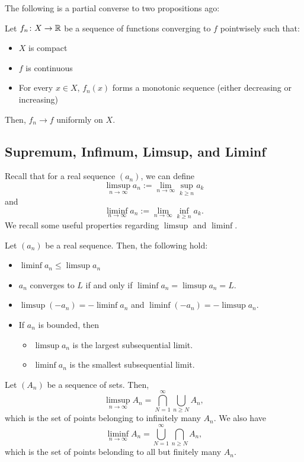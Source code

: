 The following is a partial converse to two propositions ago:

\begin{theorem}
Let $f_n \colon X \rightarrow \mathbb{R}$ be a sequence of functions converging to $f$ pointwisely such that:
\begin{itemize}
\item $X$ is compact
\item $f$ is continuous
\item For every $x \in X$, $f_n(x)$ forms a monotonic sequence (either decreasing or increasing)
\end{itemize}
Then, $f_n \rightarrow f$ uniformly on $X$.
\end{theorem}


\subsection{Supremum, Infimum, Limsup, and Liminf}

Recall that for a real sequence $(a_n)$, we can define
\[
\limsup_{n\to\infty}a_n := \lim_{n\to\infty}\sup_{k\ge n}a_k
\]
and
\[
\liminf_{n\to\infty}a_n:=\lim_{n\to\infty}\inf_{k\ge n}a_k.
\]
We recall some useful properties regarding $\limsup$ and $\liminf$.

\begin{proposition}
Let $(a_n)$ be a real sequence. Then, the following hold:
\begin{itemize}
\item $\liminf a_n \leq \limsup a_n$
\item $a_n$ converges to $L$ if and only if $\liminf a_n=\limsup a_n=L$.
\item $\limsup(-a_n)=-\liminf a_n$ and $\liminf(-a_n)=-\limsup a_n$.
\item If $a_n$ is bounded, then \begin{itemize}
    \item $\limsup a_n$ is the largest subsequential limit.
    \item $\liminf a_n$ is the smallest subsequential limit.
\end{itemize}
\end{itemize}
\end{proposition}

\begin{proposition}
Let $(A_n)$ be a sequence of sets. Then,
\[
\limsup_{n\to\infty}A_n = \bigcap_{N=1}^{\infty} \bigcup_{n\ge N}A_n,
\]
which is the set of points belonging to infinitely many $A_n$. We also have 
\[
\liminf_{n\to\infty}A_n = \bigcup_{N=1}^{\infty}\bigcap_{n\ge N}A_n,
\]
which is the set of points belonding to all but finitely many $A_n$.
\end{proposition}


